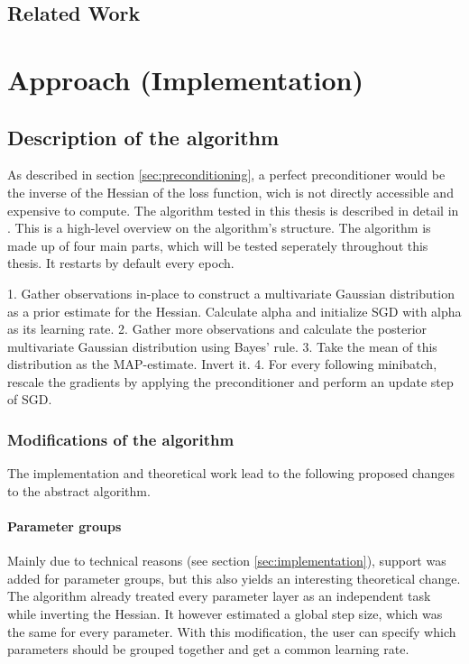 \documentclass[twoside,12pt,a4paper]{report}
\begin{document}
\section{Related Work}


\chapter{Approach (Implementation)}
\section{Description of the algorithm}
As described in section \ref{sec:preconditioning}, a perfect preconditioner would be the inverse of the Hessian of the loss function, wich is not directly accessible and expensive to compute.
The algorithm tested in this thesis is described in detail in \cite{roos2019active}.
This is a high-level overview on the algorithm's structure.
The algorithm is made up of four main parts, which will be tested seperately throughout this thesis.
It restarts by default every epoch.
\begin{markdown}
1. Gather observations in-place to construct a multivariate Gaussian distribution as a prior estimate for the Hessian. Calculate alpha and initialize SGD with alpha as its learning rate.
2. Gather more observations and calculate the posterior multivariate Gaussian distribution using Bayes' rule.
3. Take the mean of this distribution as the MAP-estimate. Invert it.
4. For every following minibatch, rescale the gradients by applying the preconditioner and perform an update step of SGD.
\end{markdown}


\subsection{Modifications of the algorithm}
The implementation and theoretical work lead to the following proposed changes to the abstract algorithm.

\subsubsection{Parameter groups}
Mainly due to technical reasons (see section \ref{sec:implementation}), support was added for parameter groups, but this also yields an interesting theoretical change. The algorithm already treated every parameter layer as an independent task while inverting the Hessian. It however estimated a global step size, which was the same for every parameter. With this modification, the user can specify which parameters should be grouped together and get a common learning rate.
\end{document}
